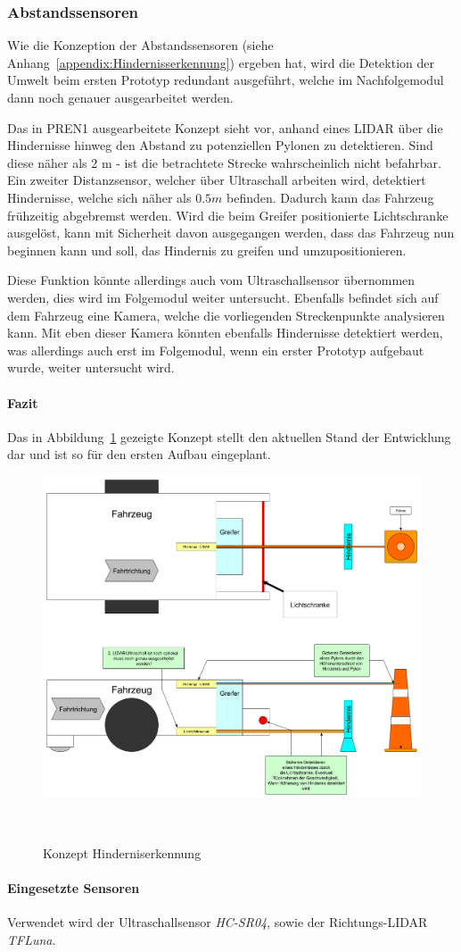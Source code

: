 \documentclass[main.tex]{subfiles} %
\begin{document}

\subsubsection{Abstandssensoren}

Wie die Konzeption der Abstandssensoren (siehe
Anhang~\ref{appendix:Hindernisserkennung}) ergeben hat, wird die Detektion der
Umwelt beim ersten Prototyp redundant ausgeführt, welche im Nachfolgemodul dann
noch genauer ausgearbeitet werden.

Das in PREN1 ausgearbeitete Konzept sieht vor, anhand eines LIDAR über die
Hindernisse hinweg den Abstand zu potenziellen Pylonen zu detektieren. Sind
diese näher als 2 m - ist die betrachtete Strecke wahrscheinlich nicht
befahrbar. Ein zweiter Distanzsensor, welcher über Ultraschall arbeiten wird,
detektiert Hindernisse, welche sich näher als $0.5 m$ befinden. Dadurch kann
das Fahrzeug frühzeitig abgebremst werden. Wird die beim Greifer positionierte
Lichtschranke ausgelöst, kann mit Sicherheit davon ausgegangen werden, dass das
Fahrzeug nun beginnen kann und soll, das Hindernis zu greifen und
umzupositionieren.

Diese Funktion könnte allerdings auch vom Ultraschallsensor übernommen werden,
dies wird im Folgemodul weiter untersucht. Ebenfalls befindet sich auf dem
Fahrzeug eine Kamera, welche die vorliegenden Streckenpunkte analysieren kann.
Mit eben dieser Kamera könnten ebenfalls Hindernisse detektiert werden, was
allerdings auch erst im Folgemodul, wenn ein erster Prototyp aufgebaut wurde,
weiter untersucht wird.

\paragraph{Fazit} Das in Abbildung~\ref{fig:Konzept_Hinderniserkennung} gezeigte Konzept stellt
den aktuellen Stand der Entwicklung dar und ist so für den ersten Aufbau
eingeplant.


\begin{figure}[h!]
    \centering
    \includegraphics[width=0.75\linewidth]{./fig_Abstandssensor/Konzept_Hinderniserkennung.pdf}
    \caption{Konzept Hinderniserkennung}~\label{fig:Konzept_Hinderniserkennung}
\end{figure}

\paragraph{Eingesetzte Sensoren}
Verwendet wird der Ultraschallsensor \textit{HC-SR04}, sowie der
Richtungs-LIDAR \textit{TFLuna}.
\end{document}
